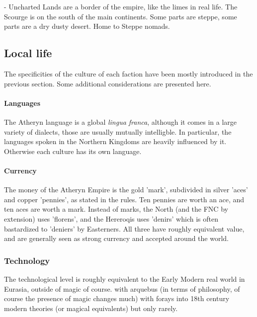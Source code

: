 - Uncharted Lands are a border of the empire, like the limes in real life.
The Scourge is on the south of the main continents. Some parts are steppe, some parts are a dry dusty desert. Home to Steppe nomads.







\subsection{Local life}



The specificities of the culture of each faction have been mostly introduced in the previous section. Some additional considerations are presented here.

\paragraph{Languages}

The Atheryn language is a global \textit{lingua franca}, although it comes in a large variety of dialects, those are usually mutually intelligble. In particular, the languages spoken in the Northern Kingdoms are heavily influenced by it. Otherwise each culture has its own language.

\paragraph{Currency}

The money of the Atheryn Empire is the gold 'mark', subdivided in silver 'aces' and copper 'pennies', as stated in the rules. Ten pennies are worth an ace, and ten aces are worth a mark. Instead of marks, the North (and the FNC by extension) uses 'florens', and the Hereroqis uses 'denirs' which is often bastardized to 'deniers' by Easterners. All three have roughly equivalent value, and are generally seen as strong currency and accepted around the world.


\subsubsection{Technology}

The technological level is roughly equivalent to the Early Modern real world in Eurasia, outside of magic of course. with arquebus (in terms of philosophy, of course the presence of magic changes much) with forays into 18th century modern theories (or magical equivalents) but only rarely.


